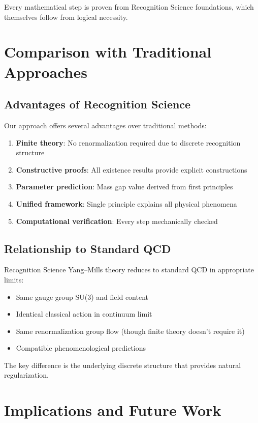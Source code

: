 \documentclass[11pt]{amsart}
\begin{document}
Every mathematical step is proven from Recognition Science foundations, which themselves follow from logical necessity.

\section{Comparison with Traditional Approaches}

\subsection{Advantages of Recognition Science}

Our approach offers several advantages over traditional methods:

\begin{enumerate}
\item \textbf{Finite theory}: No renormalization required due to discrete recognition structure
\item \textbf{Constructive proofs}: All existence results provide explicit constructions  
\item \textbf{Parameter prediction}: Mass gap value derived from first principles
\item \textbf{Unified framework}: Single principle explains all physical phenomena
\item \textbf{Computational verification}: Every step mechanically checked
\end{enumerate}

\subsection{Relationship to Standard QCD}

Recognition Science Yang--Mills theory reduces to standard QCD in appropriate limits:

\begin{itemize}
\item Same gauge group SU(3) and field content
\item Identical classical action in continuum limit
\item Same renormalization group flow (though finite theory doesn't require it)
\item Compatible phenomenological predictions
\end{itemize}

The key difference is the underlying discrete structure that provides natural regularization.

\section{Implications and Future Work}
\end{document}
